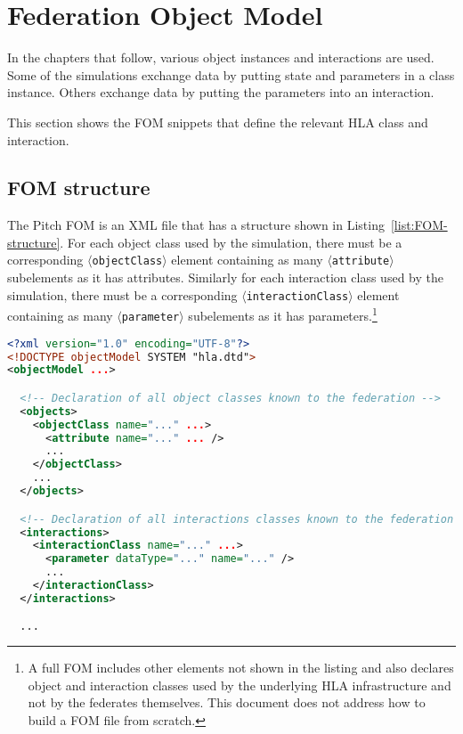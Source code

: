 \section{Federation Object Model}
\label{sec:FOM}

In the chapters that follow, various object instances and interactions are used.
Some of the simulations exchange data by putting \simplesine state and parameters
in a class instance.
Others exchange data by putting the parameters into an interaction.


This section shows the FOM snippets that define the relevant HLA class
and interaction.

\subsection{FOM structure}

The Pitch FOM is an XML file that has a structure shown in
Listing~\ref{list:FOM-structure}.
For each object class used by the simulation,
there must be a corresponding $\langle${\tt objectClass}$\rangle$ element
containing as many $\langle${\tt attribute}$\rangle$
subelements as it has attributes.
Similarly for each interaction class used by the simulation,
there must be a corresponding $\langle${\tt interactionClass}$\rangle$
element containing as many $\langle${\tt parameter}$\rangle$
subelements as it has parameters.\footnote{
  A full FOM includes other elements not shown in the listing
  and also declares object and interaction classes used by the underlying
  HLA infrastructure and not by the federates themselves.
  This document does not address how to build a FOM file from scratch.
}

\begin{lstlisting}[language=xml,caption={FOM structure},label={list:FOM-structure}]
<?xml version="1.0" encoding="UTF-8"?>
<!DOCTYPE objectModel SYSTEM "hla.dtd">
<objectModel ...>

  <!-- Declaration of all object classes known to the federation -->
  <objects>
    <objectClass name="..." ...>
      <attribute name="..." ... />
      ...
    </objectClass>
    ...
  </objects>

  <!-- Declaration of all interactions classes known to the federation -->
  <interactions>
    <interactionClass name="..." ...>
      <parameter dataType="..." name="..." />
      ...
    </interactionClass>
  </interactions>

  ...
\end{lstlisting}

